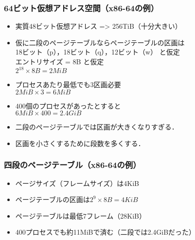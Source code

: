 \documentclass{beamer}                   %
\begin{document}
\begin{frame}
  \frametitle{64ビット仮想アドレス空間（x86-64の例）}
  \begin{itemize}
  \item 実質48ビット仮想アドレス => 256TiB（十分大きい）
  \item 仮に二段のページテーブルならページテーブルの区画は \\
    18ビット（p），18ビット（q），12ビット（w） と仮定 \\
    エントリサイズ = 8B  と仮定 \\
    $2^{18} \times 8B = 2MiB$
  \item プロセスあたり最低でも3区画必要 \\
    $2MiB \times 3 = 6MiB$
  \item 400個のプロセスがあったとすると \\
    $6MiB \times 400 = 2.4GiB$
  \item 二段のページテーブルでは区画が大きくなりすぎる．
  \item 区画を小さくするために段数を多くする．
  \end{itemize}
\end{frame}

\begin{frame}
  \frametitle{四段のページテーブル（x86-64の例）}
  \begin{itemize}
  \item ページサイズ（フレームサイズ）は4KiB
  \item ページテーブルの区画は$2^9 \times 8B = 4KiB$
  \item ページテーブルは最低7フレーム（28KiB）
  \item 400プロセスでも約11MiBで済む（二段では2.4GiBだった）
  \end{itemize}
\end{frame}
\end{document}
